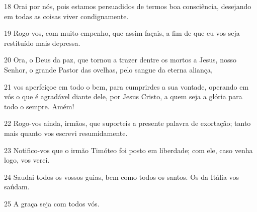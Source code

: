 \par 18 Orai por nós, pois estamos persuadidos de termos boa consciência, desejando em todas as coisas viver condignamente.
\par 19 Rogo-vos, com muito empenho, que assim façais, a fim de que eu vos seja restituído mais depressa.
\par 20 Ora, o Deus da paz, que tornou a trazer dentre os mortos a Jesus, nosso Senhor, o grande Pastor das ovelhas, pelo sangue da eterna aliança,
\par 21 vos aperfeiçoe em todo o bem, para cumprirdes a sua vontade, operando em vós o que é agradável diante dele, por Jesus Cristo, a quem seja a glória para todo o sempre. Amém!
\par 22 Rogo-vos ainda, irmãos, que suporteis a presente palavra de exortação; tanto mais quanto vos escrevi resumidamente.
\par 23 Notifico-vos que o irmão Timóteo foi posto em liberdade; com ele, caso venha logo, vos verei.
\par 24 Saudai todos os vossos guias, bem como todos os santos. Os da Itália vos saúdam.
\par 25 A graça seja com todos vós.



